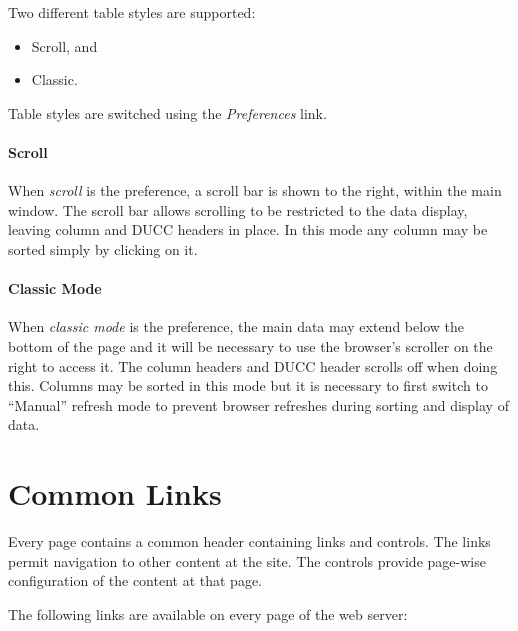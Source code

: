     Two different table styles are supported:
    \begin{itemize}
      \item Scroll, and
      \item Classic.
    \end{itemize}
    Table styles are switched using the {\em Preferences} link.

    \paragraph{Scroll}  When {\em scroll} is the preference, a scroll bar is
    shown to the right, within the main window.  The scroll bar allows scrolling to be restricted to the data
    display, leaving column and DUCC headers in place.  In this mode any column may be sorted
    simply by clicking on it.

    \paragraph{Classic Mode}  When {\em classic mode} is the preference, the
    main data may extend below the bottom of the page and it will be necessary to use the browser's scroller on the right
    to access it.  The column headers and DUCC header scrolls off when doing this.  Columns
    may be sorted in this mode but it is necessary to first switch to ``Manual'' refresh mode to
    prevent browser refreshes during sorting and display of data. 

\ifpdf
\else
{}
\fi
    \section{Common Links}

        Every page contains a common header containing links and controls. The links permit navigation
        to other content at the site. The controls provide page-wise configuration of the content at
        that page.

        The following links are available on every page of the web server: 

